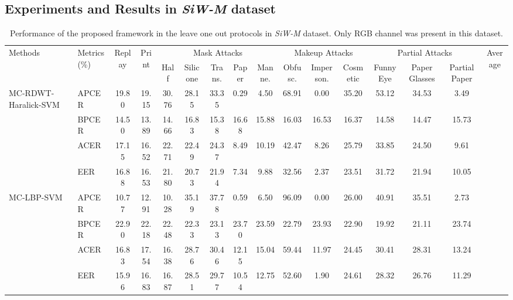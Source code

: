 \documentclass[journal]{IEEEtran}
\begin{document}
\subsection{Experiments and Results in \textit{SiW-M} dataset}

\begin{table*}[ht!]
\small
	\centering
	\caption{Performance of the proposed framework in the leave one out protocols in \textit{SiW-M} dataset. Only RGB channel was present in this dataset.}
	\vspace{-3mm}
	\resizebox{\textwidth}{!}
{
{

	\begin{tabular}{l|l|c|c|c|c|c|c|c|c|c|c|c|c|c|c}
	\toprule
	\multirow{2}{*}{Methods} & \multirow{2}{*}{Metrics (\%)} &\multirow{2}{*}{Replay}& \multirow{2}{*}{Print} & \multicolumn{5}{c|}{Mask Attacks}  & \multicolumn{3}{c|}{Makeup Attacks}  &  \multicolumn{3}{c|}{Partial Attacks} & \multirow{2}{*}{Average}\\ \cline{5-15}
	 &&&  & Half & Silicone & Trans. & Paper & Manne. & Obfusc. & Imperson. & Cosmetic & Funny Eye & Paper Glasses & Partial Paper &\\ \midrule

    \multirow{4}{*}{MC-RDWT-Haralick-SVM }
	& APCER &  19.80 & 19.15 &  30.76 &  28.15 &   33.35 &   0.29 &    4.50 &  68.91 &     0.00 &   35.20 &  53.12 &    34.53 &    3.49 &  \\ \cline{3-16}
	& BPCER &  14.50 & 13.89 &  14.66 &  16.83 &   15.38 &  16.68 &   15.88 &  16.03 &    16.53 &   16.37 &  14.58 &    14.47 &   15.73 &  \\ \cline{3-16}
	& ACER  &  17.15 & 16.52 &  22.71 &  22.49 &   24.37 &   8.49 &   10.19 &  42.47 &     8.26 &   25.79 &  33.85 &    24.50 &    9.61 &  \\ \cline{3-16}
	& EER   &  16.88 & 16.53 &  21.80 &  20.73 &   21.94 &   7.34 &    9.88 &  32.56 &     2.37 &   23.51 &  31.72 &    21.94 &   10.05 &  \\ \midrule

	\multirow{4}{*}{MC-LBP-SVM }
	&APCER &  10.77 &  12.91 &  10.28 &  35.19 &  37.78 &   0.59 &   6.50 &  96.09 &   0.00 &  26.00 & 40.91 &  35.51 &   2.73 &  \\ \cline{3-16}
	&BPCER &  22.90 &  22.18 &  22.48 &  22.33 &  23.13 &  23.70 &  23.59 &  22.79 &  23.93 &  22.90 & 19.92 &  21.11 &  23.74 &  \\ \cline{3-16}
	&ACER  &  16.83 &  17.54 &  16.38 &  28.76 &  30.46 &  12.15 &  15.04 &  59.44 &  11.97 &  24.45 & 30.41 &  28.31 &  13.24 &  \\ \cline{3-16}
	&EER   &  15.96 &  16.83 &  16.87 &  28.51 &  29.77 &  10.54 &  12.75 &  52.60 &   1.90 &  24.61 & 28.32 &  26.76 &  11.29 &  \\ \midrule


\end{tabular}}}
\end{table*}
\end{document}
